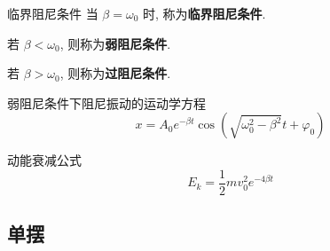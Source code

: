 \documentclass[UTF8]{ctexart}
\begin{document}
            \begin{dfn}
                {临界阻尼条件}
                当 \(\beta=\omega_0\) 时, 称为\textbf{临界阻尼条件}. 

                若 \(\beta<\omega_0\), 则称为\textbf{弱阻尼条件}. 

                若 \(\beta>\omega_0\), 则称为\textbf{过阻尼条件}. 
            \end{dfn}
            
            \begin{thm}
                {弱阻尼条件下阻尼振动的运动学方程}
                \[x=A_0e^{-\beta t}\cos(\sqrt{\omega_0^2-\beta^2}t+\varphi_0)\]
            \end{thm}
            
            \begin{thm}
                {动能衰减公式}
                \[E_k=\frac{1}{2}mv_0^2 e^{-4\beta t}\]
            \end{thm}

        \subsection{单摆}
    
\end{document}
